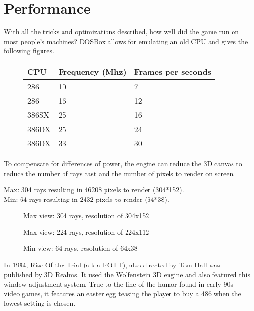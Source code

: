 \section{Performance}
With all the tricks and optimizations described, how well did the game run on most people's machines? DOSBox allows for emulating an old CPU and gives the following figures.

\begin{figure}[H]
\centering
\begin{tabularx}{\textwidth}{ X X X }
  \toprule
  \textbf{CPU} & \textbf{Frequency (Mhz)} & \textbf{Frames per seconds} \\ \bottomrule
  286 & 10 & 7 \\
286 & 16 & 12 \\
386SX & 25 &  16 \\
386DX & 25 & 24 \\
386DX & 33 & 30 \\ \bottomrule
\end{tabularx}
\end{figure}

To compensate for differences of power, the engine can reduce the 3D canvas to reduce the number of rays cast and the number of pixels to render on screen.
\par
Max: 304 rays resulting in 46208 pixels to render (304*152).\\
Min:  64 rays resulting in 2432 pixels to render (64*38).\\

  \begin{figure}[H]
\centering
 \caption{Max view: 304 rays, resolution of 304x152}
 \end{figure}
 \par

   \begin{figure}[H]
\centering
 \caption{Max view: 224 rays, resolution of 224x112}
 \end{figure}
 \par

   \begin{figure}[H]
\centering
 \caption{Min view: 64 rays, resolution of 64x38}
 \end{figure}
 \par

In 1994, Rise Of the Trial (a.k.a ROTT), also directed by Tom Hall was published by 3D Realms. It used the Wolfenstein 3D engine and also featured this window adjustment system. True to the line of the humor found in early 90s video games, it features an easter egg teasing the player to buy a 486 when the lowest setting is chosen.
    \begin{figure}[H]
\centering
 \end{figure}
 \par